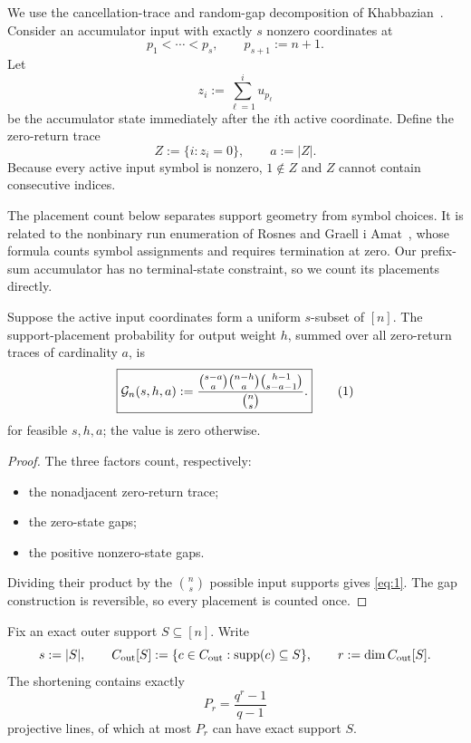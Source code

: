 \documentclass[runningheads,envcountsame,envcountsect]{llncs}
\newcommand{\supp}{\operatorname{supp}}
\newcommand{\cG}{\mathcal G}
\newcommand{\eqnumlabel}[1]{%
  \refstepcounter{equation}\tag{\theequation}\label{#1}%
}
\begin{document}
We use the cancellation-trace and random-gap decomposition of
Khabbazian~\cite[Section~3]{khabbazian26}.  Consider an accumulator input with
exactly $s$ nonzero coordinates at
\[
    p_1<\cdots<p_s,
    \qquad p_{s+1}:=n+1.
\]
Let
\[
    z_i:=\sum_{\ell=1}^i u_{p_\ell}
\]
be the accumulator state immediately after the $i$th active coordinate.
Define the zero-return trace
\[
    Z:=\{i:z_i=0\},
    \qquad a:=|Z|.
\]
Because every active input symbol is nonzero, $1\notin Z$ and $Z$ cannot contain
consecutive indices.

The placement count below separates support geometry from symbol choices.
It is related to the nonbinary run enumeration of Rosnes and Graell i
Amat~\cite[Theorem~2]{rosnes11}, whose formula counts symbol assignments and
requires termination at zero.  Our prefix-sum accumulator has no terminal-state
constraint, so we count its placements directly.

\begin{lemma}
\label{lem:nonbinary-placement}
Suppose the active input coordinates form a uniform $s$-subset of $[n]$.  The
support-placement probability for output weight $h$, summed over all
zero-return traces of cardinality $a$, is
\[
    \boxed{
    \cG_n(s,h,a)
      :=
    \frac{
      \binom{s-a}{a}
      \binom{n-h}{a}
      \binom{h-1}{s-a-1}
    }{
      \binom{n}{s}
    }.
    }
    \eqnumlabel{eq:1}
\]
for feasible $s,h,a$; the value is zero otherwise.
\end{lemma}

\begin{proof}
The three factors count, respectively:
\begin{itemize}
    \item the nonadjacent zero-return trace;
    \item the zero-state gaps;
    \item the positive nonzero-state gaps.
\end{itemize}
Dividing their product by the $\binom{n}{s}$ possible input supports gives \eqref{eq:1}.
The gap construction is reversible, so every placement is counted once.
\end{proof}

Fix an exact outer support $S\subseteq[n]$.  Write
\[
    s:=|S|,
    \qquad
    C_{\rm out}[S]
      :=
    \{c\in C_{\rm out}:\supp(c)\subseteq S\},
    \qquad
    r:=\dim C_{\rm out}[S].
\]
The shortening contains exactly
\[
    P_r=\frac{q^r-1}{q-1}
\]
projective lines, of which at most $P_r$ can have exact support $S$.
\end{document}

